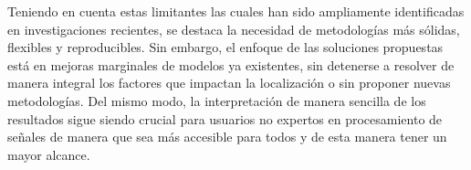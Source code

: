 Teniendo en cuenta estas limitantes las cuales han sido ampliamente identificadas en investigaciones recientes, se destaca la necesidad de metodologías más sólidas, flexibles y reproducibles. Sin embargo, el enfoque de las soluciones propuestas está en mejoras marginales de modelos ya existentes, sin detenerse a resolver de manera integral los factores que impactan la localización o sin proponer nuevas metodologías. Del mismo modo, la interpretación de manera sencilla de los resultados sigue siendo crucial para usuarios no expertos en procesamiento de señales de manera que sea más accesible para todos y de esta manera tener un mayor alcance.

